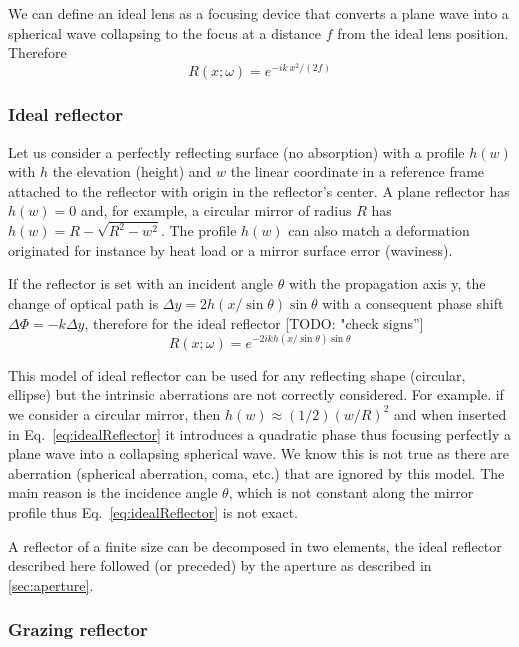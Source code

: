 \documentclass{iucr}              %
\newcommand{\todo}[1]{{\color{red}[TODO: "#1'']}}
\begin{document}
We can define an ideal lens as a focusing device that converts a plane wave into a spherical wave collapsing to the focus at a distance $f$ from the ideal lens position. Therefore
\begin{equation}
    R(x;\omega) = e^{-i k~x^2/(2 f)}
\end{equation}

\subsubsection{Ideal reflector}
\label{sec:idealReflector}

Let us consider a perfectly reflecting surface (no absorption) with a profile $h(w)$ with $h$ the elevation (height) and $w$ the linear coordinate in a reference frame attached to the reflector with origin in the reflector's center. A plane reflector has $h(w)=0$ and, for example, a circular mirror of radius $R$ has $h(w)=R-\sqrt{R^2 - w^2}$. The profile $h(w)$ can also match a deformation originated for instance by heat load or a mirror surface error (waviness).

If the reflector is set with an incident angle $\theta$ with the propagation axis y, the change of optical path is $\Delta y = 2 h(x/\sin \theta) \sin \theta$ with a consequent phase shift $\Delta \Phi = - k \Delta y $, therefore for the ideal reflector \todo{check signs}
\begin{equation}
\label{eq:idealReflector}
    R(x;\omega) = e^{-2 i k h(x/\sin \theta) \sin \theta}
\end{equation} 

This model of ideal reflector can be used for any reflecting shape (circular, ellipse) but the intrinsic aberrations are not correctly considered. For example. if we consider a circular mirror, then $h(w) \approx (1/2) (w/R)^2$ and when inserted in Eq.~\ref{eq:idealReflector} it introduces a quadratic phase thus focusing perfectly a plane wave into a collapsing spherical wave. We know this is not true as there are aberration (spherical aberration, coma, etc.) that are ignored by this model. The main reason is the incidence angle $\theta$, which is not constant along the mirror profile thus Eq.~\ref{eq:idealReflector} is not exact.

A reflector of a finite size can be decomposed in two elements, the ideal reflector described here followed (or preceded) by the aperture as described in \ref{sec:aperture}.

\subsubsection{Grazing reflector}
\label{sec:grazingReflector}
\end{document}
